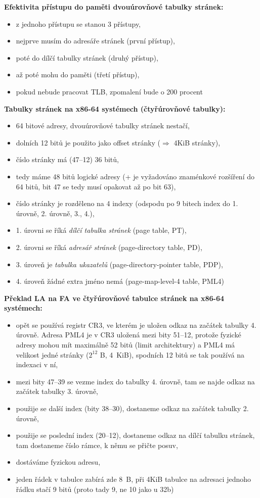 \documentclass[a4paper, 11pt]{article}
\begin{document}
\textbf{Efektivita přístupu do paměti dvouúrovňové tabulky stránek:}
\begin{itemize}
    \item z jednoho přístupu se stanou 3 přístupy,
    \item nejprve musím do adresáře stránek (první přístup),
    \item poté do dílčí tabulky stránek (druhý přístup),
    \item až poté mohu do paměti (třetí přístup),
    \item pokud nebude pracovat TLB, zpomalení bude o 200 procent
\end{itemize}
 
\textbf{Tabulky stránek na x86-64 systémech (čtyřúrovňové tabulky):}
\begin{itemize}
    \item 64 bitové adresy, dvouúrovňové tabulky stránek nestačí,
    \item dolních 12 bitů je použito jako offset stránky ($\Rightarrow$ 4KiB stránky),
    \item číslo stránky má (47--12) 36 bitů,
    \item tedy máme 48 bitů logické adresy (+ je vyžadováno znaménkové rozšíření do 64 bitů, bit 47 se tedy musí opakovat až po bit 63),
    \item číslo stránky je rozděleno na 4 indexy (odspodu po 9 bitech index do 1. úrovně, 2. úrovně, 3., 4.),
    \item 1. úrovni se říká \emph{dílčí tabulka stránek} (page table, PT),
    \item 2. úrovni se říká \emph{adresář stránek} (page-directory table, PD),
    \item 3. úroveň je \emph{tabulka ukazatelů} (page-directory-pointer table, PDP),
    \item 4. úroveň žádné extra jméno nemá (page-map-level-4 table, PML4)
\end{itemize}

\textbf{Překlad LA na FA ve čtyřúrovňové tabulce stránek na x86-64 systémech:}
\begin{itemize}
    \item opět se používá registr CR3, ve kterém je uložen odkaz na začátek tabulky 4. úrovně. Adresa PML4 je v CR3 uložená mezi bity 51--12, protože fyzické adresy mohou mít maximálně 52 bitů (limit architektury) a PML4 má velikost jedné stránky ($2^{12}$ B, 4~KiB), spodních 12 bitů se tak používá na indexaci v ní,
    \item mezi bity 47--39 se vezme index do tabulky 4. úrovně, tam se najde odkaz na začátek tabulky 3. úrovně,    
    \item použije se další index (bity 38--30), dostaneme odkaz na začátek tabulky 2. úrovně, 
    \item použije se poslední index (20--12), dostaneme odkaz na dílčí tabulku stránek, tam dostaneme číslo rámce, k němu se přičte posuv,
    \item dostáváme fyzickou adresu,
    \item jeden řádek v tabulce zabírá zde 8~B, při 4KiB tabulce na adresaci jednoho řádku stačí 9 bitů (proto tady 9, ne 10 jako u 32b)
\end{itemize}
 
\end{document}
